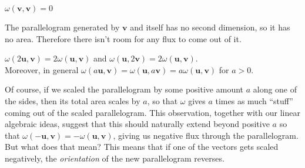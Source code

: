 	\begin{obs}
		$\omega(\mathbf v, \mathbf v) = 0$
	\end{obs}
	The parallelogram generated by $\mathbf v$ and itself has no second dimension, so it has no area. Therefore there isn't room for any flux to come out of it.
	\begin{obs}
		$\omega(2\mathbf u, \mathbf v) = 2 \omega(\mathbf u, \mathbf v)$ and $\omega(\mathbf u,2 \mathbf v) = 2 \omega(\mathbf u, \mathbf v)$.\\
		Moreover, in general $\omega(a \mathbf u, \mathbf v) = \omega(\mathbf u,a \mathbf v)= a \omega(\mathbf u, \mathbf v)$ for $a>0$.
	\end{obs}
	Of course, if we scaled the parallelogram by some positive amount $a$ along one of the sides, then its total area scales by $a$, so that $\omega$ gives $a$ times as much ``stuff'' coming out of the scaled parallelogram. This observation, together with our linear algebraic ideas, suggest that this should naturally extend beyond positive $a$ so that $\omega(-\mathbf u,\mathbf v) = -\omega(\mathbf u, \mathbf v)$, giving us negative flux through the parallelogram. But what does that mean? This means that if one of the vectors gets scaled negatively, the \emph{orientation} of the new parallelogram reverses. 
	
